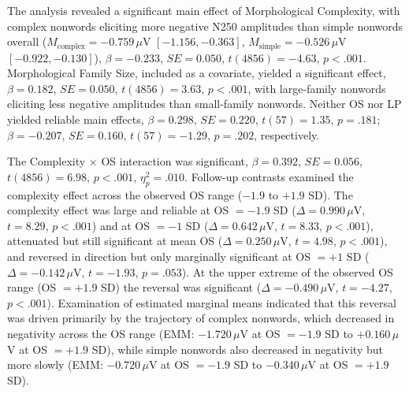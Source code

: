 \documentclass[utf8]{FrontiersinHarvard} %
\begin{document}
	The analysis revealed a significant main effect of Morphological Complexity, with complex nonwords eliciting more negative N250 amplitudes than simple nonwords overall ($M_{\text{complex}} = -0.759\,\mu$V $[-1.156, -0.363]$, $M_{\text{simple}} = -0.526\,\mu$V $[-0.922, -0.130]$), $\beta = -0.233$, $SE = 0.050$, $t(4856) = -4.63$, $p < .001$. Morphological Family Size, included as a covariate, yielded a significant effect, $\beta = 0.182$, $SE = 0.050$, $t(4856) = 3.63$, $p < .001$, with large-family nonwords eliciting less negative amplitudes than small-family nonwords. Neither OS nor LP yielded reliable main effects, $\beta = 0.298$, $SE = 0.220$, $t(57) = 1.35$, $p = .181$; $\beta = -0.207$, $SE = 0.160$, $t(57) = -1.29$, $p = .202$, respectively.
	
	The Complexity $\times$ OS interaction was significant, $\beta = 0.392$, $SE = 0.056$, $t(4856) = 6.98$, $p < .001$, $\eta^2_p = .010$. Follow-up contrasts examined the complexity effect across the observed OS range ($-1.9$ to $+1.9$ SD). The complexity effect was large and reliable at OS $= -1.9$ SD ($\Delta = 0.990\,\mu$V, $t = 8.29$, $p < .001$) and at OS $= -1$ SD ($\Delta = 0.642\,\mu$V, $t = 8.33$, $p < .001$), attenuated but still significant at mean OS ($\Delta = 0.250\,\mu$V, $t = 4.98$, $p < .001$), and reversed in direction but only marginally significant at OS $= +1$ SD ($\Delta = -0.142\,\mu$V, $t = -1.93$, $p = .053$). At the upper extreme of the observed OS range (OS $= +1.9$ SD) the reversal was significant ($\Delta = -0.490\,\mu$V, $t = -4.27$, $p < .001$). Examination of estimated marginal means indicated that this reversal was driven primarily by the trajectory of complex nonwords, which decreased in negativity across the OS range (EMM: $-1.720\,\mu$V at OS $= -1.9$ SD to $+0.160\,\mu$V at OS $= +1.9$ SD), while simple nonwords also decreased in negativity but more slowly (EMM: $-0.720\,\mu$V at OS $= -1.9$ SD to $-0.340\,\mu$V at OS $= +1.9$ SD).
	
\end{document}
